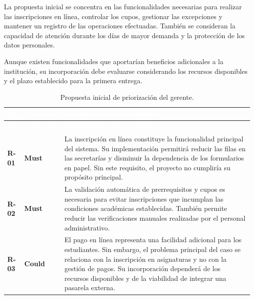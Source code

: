 \documentclass[12pt,a4paper]{article}
\newcommand{\cabecera}[1]{
    \textcolor{white}{\textbf{#1}}
}
\begin{document}
La propuesta inicial se concentra en las funcionalidades
necesarias para realizar las inscripciones en línea,
controlar los cupos, gestionar las excepciones y mantener
un registro de las operaciones efectuadas. También se
consideran la capacidad de atención durante los días de
mayor demanda y la protección de los datos personales.

Aunque existen funcionalidades que aportarían beneficios
adicionales a la institución, su incorporación debe
evaluarse considerando los recursos disponibles y el
plazo establecido para la primera entrega.

\begingroup

\small
\singlespacing

\begin{longtable}{
    C{1.2cm}
    C{2.1cm}
    L{10.7cm}
}

\caption{Propuesta inicial de priorización del gerente.}
\label{tab:moscow-gerente}\\

\cabecera{ID} &
\cabecera{Categoría} &
\cabecera{Justificación de la posición} \\

\endfirsthead

\cabecera{ID} &
\cabecera{Categoría} &
\cabecera{Justificación de la posición} \\

\endhead

\bottomrule

\endfoot

\textbf{R-01} &
\textbf{Must} &
La inscripción en línea constituye la funcionalidad
principal del sistema. Su implementación permitirá
reducir las filas en las secretarías y disminuir la
dependencia de los formularios en papel. Sin este
requisito, el proyecto no cumpliría su propósito
principal. \\

\textbf{R-02} &
\textbf{Must} &
La validación automática de prerrequisitos y cupos
es necesaria para evitar inscripciones que incumplan
las condiciones académicas establecidas. También
permite reducir las verificaciones manuales realizadas
por el personal administrativo. \\

\textbf{R-03} &
\textbf{Could} &
El pago en línea representa una facilidad adicional
para los estudiantes. Sin embargo, el problema
principal del caso se relaciona con la inscripción
en asignaturas y no con la gestión de pagos. Su
incorporación dependerá de los recursos disponibles
y de la viabilidad de integrar una pasarela externa. \\


\end{longtable}
\end{document}
